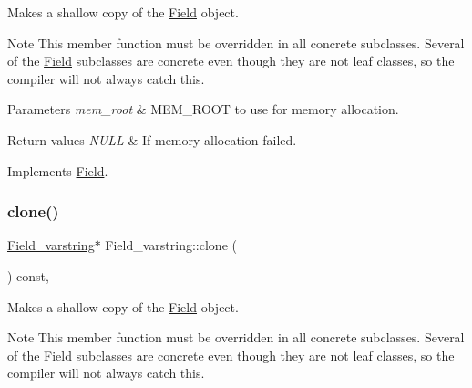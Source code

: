 Makes a shallow copy of the \mbox{\hyperlink{classField}{Field}} object.

\begin{DoxyNote}{Note}
This member function must be overridden in all concrete subclasses. Several of the \mbox{\hyperlink{classField}{Field}} subclasses are concrete even though they are not leaf classes, so the compiler will not always catch this.
\end{DoxyNote}

\begin{DoxyParams}{Parameters}
{\em mem\+\_\+root} & M\+E\+M\+\_\+\+R\+O\+OT to use for memory allocation. \\
\hline
\end{DoxyParams}

\begin{DoxyRetVals}{Return values}
{\em N\+U\+LL} & If memory allocation failed. \\
\hline
\end{DoxyRetVals}


Implements \mbox{\hyperlink{classField_a64979bcb9345803b031fff76a0c3d9fe}{Field}}.

\mbox{\label{classField__varstring_a38f3638e349096c5471c9ec582c7c73b}} 
\subsubsection{\texorpdfstring{clone()}{clone()}\hspace{0.1cm}{\footnotesize\ttfamily [2/2]}}
{\footnotesize\ttfamily \mbox{\hyperlink{classField__varstring}{Field\+\_\+varstring}}$\ast$ Field\+\_\+varstring\+::clone (\begin{DoxyParamCaption}{ }\end{DoxyParamCaption}) const\hspace{0.3cm}{\ttfamily [inline]}, {\ttfamily [virtual]}}

Makes a shallow copy of the \mbox{\hyperlink{classField}{Field}} object.

\begin{DoxyNote}{Note}
This member function must be overridden in all concrete subclasses. Several of the \mbox{\hyperlink{classField}{Field}} subclasses are concrete even though they are not leaf classes, so the compiler will not always catch this.
\end{DoxyNote}

